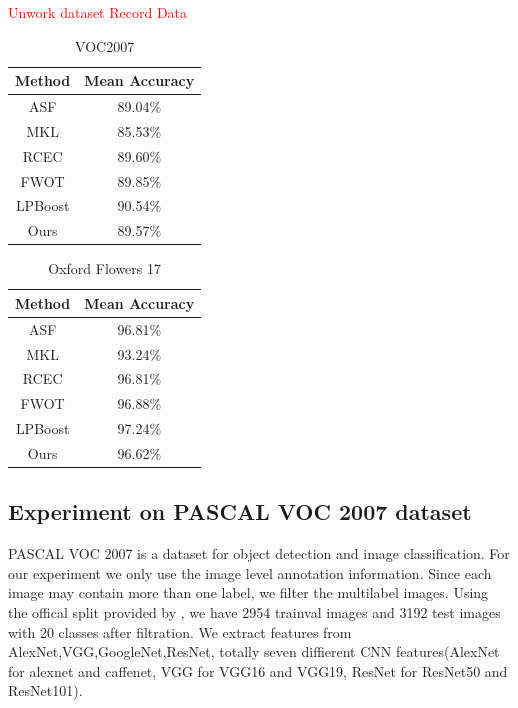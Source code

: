 \documentclass[letterpaper]{article}
\def\yanred{\textcolor{red}}
\begin{document}
\yanred{Unwork dataset Record Data}


\begin{table}[h]\small
\centering
\label{table:voc2007}
\begin{tabular}{c|c}
\hline
Method                       & Mean Accuracy     \\\hline
ASF                          & 89.04\%           \\
MKL                          & 85.53\%           \\
RCEC                         & 89.60\%           \\
FWOT                         & 89.85\%           \\
LPBoost                      & 90.54\%           \\\hline
Ours                         & 89.57\%           \\
\hline
\end{tabular}
\caption{VOC2007}
\end{table}


\begin{table}[h]\scriptsize
\centering
\label{table:flower17}
\begin{tabular}{c|c}
\hline
Method & Mean Accuracy\\\hline
ASF &  96.81\% \\
MKL &  93.24\% \\
RCEC &  96.81\% \\
FWOT &  96.88\% \\
LPBoost & 97.24\% \\\hline
Ours &  96.62\% \\
\hline
\end{tabular}
\caption{Oxford Flowers 17}
\end{table}


\iffalse
\subsection{Experiment on PASCAL VOC 2007 dataset}
PASCAL VOC 2007 is a dataset for object detection and image classification. For our experiment we only use the image level annotation information. Since each image may contain more than one label, we filter the multilabel images. Using the offical split provided by \cite{pascal-voc-2007}, we have 2954 trainval images and 3192 test images with 20 classes after filtration. We extract features from AlexNet,VGG,GoogleNet,ResNet, totally seven diffierent CNN features(AlexNet for alexnet and caffenet, VGG for VGG16 and VGG19, ResNet for ResNet50 and ResNet101).
\end{document}
